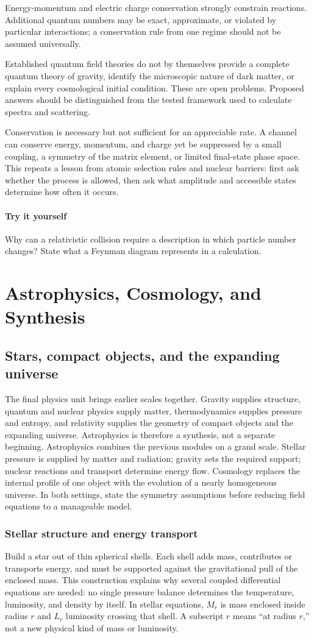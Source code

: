 \documentclass[11pt,oneside]{book}
\theoremstyle{reviewstyle}
\newcommand{\learningcheck}[1]{\subsection*{Try it yourself}\noindent #1\par}
\begin{document}
Energy-momentum and electric charge conservation strongly constrain reactions. Additional quantum numbers may be exact, approximate, or violated by particular interactions; a conservation rule from one regime should not be assumed universally.

Established quantum field theories do not by themselves provide a complete quantum theory of gravity, identify the microscopic nature of dark matter, or explain every cosmological initial condition. These are open problems. Proposed answers should be distinguished from the tested framework used to calculate spectra and scattering.

Conservation is necessary but not sufficient for an appreciable rate. A channel can conserve energy, momentum, and charge yet be suppressed by a small coupling, a symmetry of the matrix element, or limited final-state phase space. This repeats a lesson from atomic selection rules and nuclear barriers: first ask whether the process is allowed, then ask what amplitude and accessible states determine how often it occurs.

\learningcheck{Why can a relativistic collision require a description in which particle number changes? State what a Feynman diagram represents in a calculation.}

\part{Astrophysics, Cosmology, and Synthesis}
\chapter{Stars, compact objects, and the expanding universe}
The final physics unit brings earlier scales together. Gravity supplies structure, quantum and nuclear physics supply matter, thermodynamics supplies pressure and entropy, and relativity supplies the geometry of compact objects and the expanding universe. Astrophysics is therefore a synthesis, not a separate beginning.
Astrophysics combines the previous modules on a grand scale. Stellar pressure is supplied by matter and radiation; gravity sets the required support; nuclear reactions and transport determine energy flow. Cosmology replaces the internal profile of one object with the evolution of a nearly homogeneous universe. In both settings, state the symmetry assumptions before reducing field equations to a manageable model.

\section{Stellar structure and energy transport}
Build a star out of thin spherical shells. Each shell adds mass, contributes or transports energy, and must be supported against the gravitational pull of the enclosed mass. This construction explains why several coupled differential equations are needed: no single pressure balance determines the temperature, luminosity, and density by itself. In stellar equations, $M_r$ is mass enclosed inside radius $r$ and $L_r$ luminosity crossing that shell. A subscript $r$ means ``at radius $r$,'' not a new physical kind of mass or luminosity.
\end{document}
